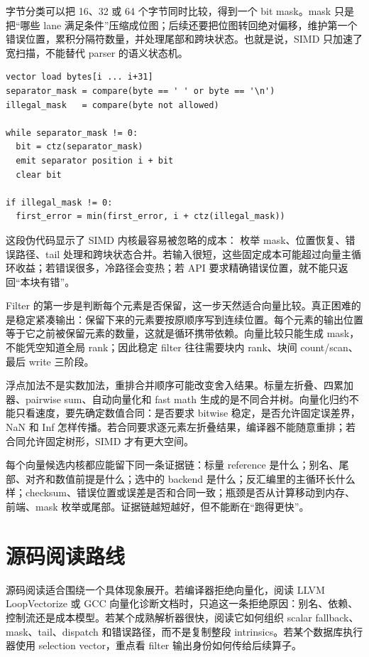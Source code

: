 字节分类可以把 16、32 或 64 个字节同时比较，得到一个 bit mask。mask 只是把“哪些 lane 满足条件”压缩成位图；后续还要把位图转回绝对偏移，维护第一个错误位置，累积分隔符数量，并处理尾部和跨块状态。也就是说，SIMD 只加速了宽扫描，不能替代 parser 的语义状态机。

\begin{lstlisting}[numbers=none,caption={mask 到语义结果的推导}]
vector load bytes[i ... i+31]
separator_mask = compare(byte == ' ' or byte == '\n')
illegal_mask   = compare(byte not allowed)

while separator_mask != 0:
  bit = ctz(separator_mask)
  emit separator position i + bit
  clear bit

if illegal_mask != 0:
  first_error = min(first_error, i + ctz(illegal_mask))
\end{lstlisting}

这段伪代码显示了 SIMD 内核最容易被忽略的成本： 枚举 mask、位置恢复、错误路径、tail 处理和跨块状态合并。若输入很短，这些固定成本可能超过向量主循环收益；若错误很多，冷路径会变热；若 API 要求精确错误位置，就不能只返回“本块有错”。

Filter 的第一步是判断每个元素是否保留，这一步天然适合向量比较。真正困难的是稳定紧凑输出：保留下来的元素要按原顺序写到连续位置。每个元素的输出位置等于它之前被保留元素的数量，这就是循环携带依赖。向量比较只能生成 mask，不能凭空知道全局 rank；因此稳定 filter 往往需要块内 rank、块间 count/scan、最后 write 三阶段。

浮点加法不是实数加法，重排合并顺序可能改变舍入结果。标量左折叠、四累加器、pairwise sum、自动向量化和 fast math 生成的是不同合并树。向量化归约不能只看速度，要先确定数值合同：是否要求 bitwise 稳定，是否允许固定误差界，NaN 和 Inf 怎样传播。若合同要求逐元素左折叠结果，编译器不能随意重排；若合同允许固定树形，SIMD 才有更大空间。

每个向量候选内核都应能留下同一条证据链：标量 reference 是什么；别名、尾部、对齐和数值前提是什么；选中的 backend 是什么；反汇编里的主循环长什么样；checksum、错误位置或误差是否和合同一致；瓶颈是否从计算移动到内存、前端、mask 枚举或尾部。证据链越短越好，但不能断在“跑得更快”。

\section{源码阅读路线}

源码阅读适合围绕一个具体现象展开。若编译器拒绝向量化，阅读 LLVM LoopVectorize 或 GCC 向量化诊断文档时，只追这一条拒绝原因：别名、依赖、控制流还是成本模型。若某个成熟解析器很快，阅读它如何组织 scalar fallback、mask、tail、dispatch 和错误路径，而不是复制整段 intrinsics。若某个数据库执行器使用 selection vector，重点看 filter 输出身份如何传给后续算子。


